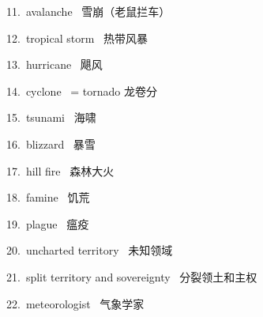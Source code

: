 \documentclass[a4paper, 12pt]{article}
\begin{document}
\begin{multicols}{2}
\begin{flushleft}
11.\ avalanche \ 雪崩（老鼠拦车）
\end{flushleft}

\begin{flushleft}
12.\ tropical storm \ 热带风暴
\end{flushleft}
\end{multicols}

\begin{multicols}{2}
\begin{flushleft}
13.\ hurricane \ 飓风
\end{flushleft}

\begin{flushleft}
14.\ cyclone \  = tornado 龙卷分
\end{flushleft}
\end{multicols}

\begin{multicols}{2}
\begin{flushleft}
15.\ tsunami \ 海啸
\end{flushleft}

\begin{flushleft}
16.\ blizzard \ 暴雪
\end{flushleft}
\end{multicols}

\begin{multicols}{2}
\begin{flushleft}
17.\ hill fire \ 森林大火
\end{flushleft}

\begin{flushleft}
18.\ famine \ 饥荒
\end{flushleft}
\end{multicols}

\begin{multicols}{2}
\begin{flushleft}
19.\ plague \ 瘟疫
\end{flushleft}

\begin{flushleft}
20.\ uncharted territory \ 未知领域
\end{flushleft}
\end{multicols}

\begin{multicols}{2}
\begin{flushleft}
21.\ split territory and sovereignty \ 分裂领土和主权
\end{flushleft}

\begin{flushleft}
22.\ meteorologist \ 气象学家
\end{flushleft}
\end{multicols}
\end{document}
